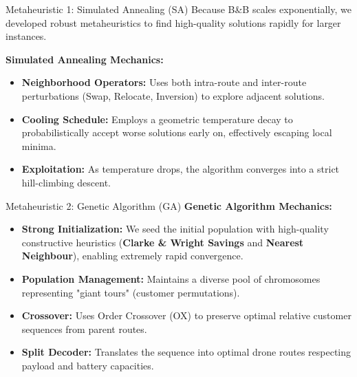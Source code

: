 \documentclass[11pt,aspectratio=169]{beamer}
\begin{document}
\begin{frame}{Metaheuristic 1: Simulated Annealing (SA)}
    Because B\&B scales exponentially, we developed robust metaheuristics to find high-quality solutions rapidly for larger instances.
    
    \vspace{0.3cm}
    \textbf{Simulated Annealing Mechanics:}
    \begin{itemize}
        \item \textbf{Neighborhood Operators:} Uses both intra-route and inter-route perturbations (Swap, Relocate, Inversion) to explore adjacent solutions.
        \item \textbf{Cooling Schedule:} Employs a geometric temperature decay to probabilistically accept worse solutions early on, effectively escaping local minima.
        \item \textbf{Exploitation:} As temperature drops, the algorithm converges into a strict hill-climbing descent.
    \end{itemize}
\end{frame}

\begin{frame}{Metaheuristic 2: Genetic Algorithm (GA)}
    \textbf{Genetic Algorithm Mechanics:}
    \begin{itemize}
        \item \textbf{Strong Initialization:} We seed the initial population with high-quality constructive heuristics (\textbf{Clarke \& Wright Savings} and \textbf{Nearest Neighbour}), enabling extremely rapid convergence.
        \item \textbf{Population Management:} Maintains a diverse pool of chromosomes representing "giant tours" (customer permutations).
        \item \textbf{Crossover:} Uses Order Crossover (OX) to preserve optimal relative customer sequences from parent routes.
        \item \textbf{Split Decoder:} Translates the sequence into optimal drone routes respecting payload and battery capacities.
    \end{itemize}
\end{frame}
\end{document}
